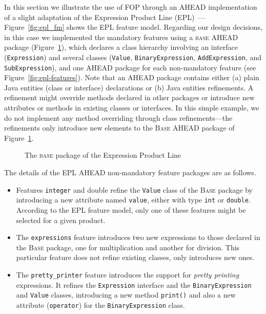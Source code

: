 In this section we illustrate the use of FOP through an AHEAD implementation 
of a slight adaptation of the Expression Product Line (EPL)~\cite{}---Figure~\ref{fig:epl_fm} shows 
the EPL feature model. Regarding our design decisions, 
in this case we implemented the mandatory features using a \textsc{base} AHEAD package (Figure~\ref{fig:epl-base}), which
declares a class hierarchy involving an interface (\texttt{Expression}) and
several classes (\texttt{Value}, \texttt{BinaryExpression}, \texttt{AddExpression}, and 
\texttt{SubExpression}), and one AHEAD package for each non-mandatory feature (see Figure~\ref{fig:epl-features}). Note 
that an AHEAD package contains either (a) plain Java entities (class or interface) declarations or (b) 
Java entities refinements. A refinement 
might override methods declared in other packages or 
introduce new attributes or methods in existing classes 
or interfaces. In this simple example, we do not implement any 
method overriding through class refinements---the refinements 
only introduce new elements to the \textsc{Base} AHEAD package 
of Figure~\ref{fig:epl-base}.  

\begin{figure}[htb]
\label{fig:epl-base}
\caption{The \textsc{base} package of the Expression Product Line}
\end{figure} 

The details of the EPL AHEAD non-mandatory feature packages are as follows. 

\begin{itemize}
\item Features \texttt{integer} and {double} refine the \texttt{Value} class of 
the \textsc{Base} package by introducing a new attribute named 
\texttt{value}, either with type \texttt{int} or \texttt{double}. According 
to the EPL feature model, only one of these features might be selected for 
a given product. 

\item The \texttt{expressions} feature introduces two new expressions 
to those declared in the \textsc{Base} package, one for multiplication 
and another for division. This particular feature does not refine 
existing classes, only introduces new ones. 

\item The \texttt{pretty\_printer} feature introduces the support for 
\emph{pretty printing} expressions. It refines the \texttt{Expression} 
interface and the \texttt{BinaryExpression} and \texttt{Value} classes, 
introducing a new method \texttt{print()} and also a 
new attribute (\texttt{operator}) for the \texttt{BinaryExpression} class.

\end{itemize}


